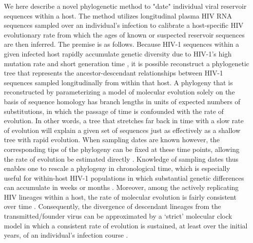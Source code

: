 \documentclass[12pt]{article}
\begin{document}
We here describe a novel phylogenetic method to "date" individual viral reservoir sequences within a host.
The method utilizes longitudinal plasma HIV RNA sequences sampled over an individual's infection to calibrate a host-specific HIV evolutionary rate from which the ages of known or suspected reservoir sequences are then inferred. The premise is as follows.
Because HIV-1 sequences within a given infected host rapidly accumulate genetic diversity due to HIV-1's high mutation rate and short generation time \citep{Alizon13,Rambaut04,Shankarappa99}, it is possible reconstruct a phylogenetic tree that represents the ancestor-descendant relationships between HIV-1 sequences sampled longitudinally from within that host.
A phylogeny that is reconstructed by parameterizing a model of molecular evolution solely on the basis of sequence homology \citep[e.g., by maximum likelihood estimation;][]{Felsenstein81} has branch lengths in units of expected numbers of substitutions, in which the passage of time is confounded with the rate of evolution.
In other words, a tree that stretches far back in time with a slow rate of evolution will explain a given set of sequences just as effectively as a shallow tree with rapid evolution.
When sampling dates are known however, the corresponding tips of the phylogeny can be fixed at these time points, allowing the rate of evolution be estimated directly \citep{Rodrigo99}.
Knowledge of sampling dates thus enables one to rescale a phylogeny in chronological time, which is especially useful for within-host HIV-1 populations in which substantial genetic differences can accumulate in weeks or months \citep{Williamson03}.
Moreover, among the actively replicating HIV lineages within a host, the rate of molecular evolution is fairly consistent over time \citep{Korber00,Kuhner95,Leitner99}.
Consequently, the divergence of descendant lineages from the transmitted/founder virus can be approximated by a ‘strict’ molecular clock model in which a consistent rate of evolution is sustained, at least over the initial years, of an individual's infection course \citep{Keele08}. 
\end{document}
